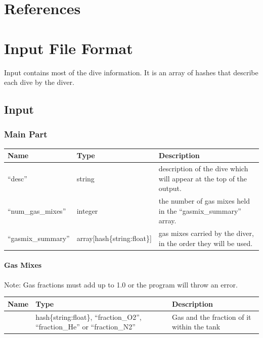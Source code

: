 \documentclass[12pt]{article}
\begin{document}
\newpage
\section{References}
\nocite{VPMforDummies}


\newpage

\appendix

\section{Input File Format}
Input contains most of the dive information. It is an array of hashes that describe each dive by the diver.

\subsection{Input}
\subsubsection{Main Part}
\begin{longtable}{|l|l|p{5cm}|}
\hline
 Name                 &  Type                         &  Description                                                          \\
\hline
 ``desc''             &  string                       &  description of the dive which will appear at the top of the output.  \\
\hline
 ``num\_gas\_mixes''  &  integer                      &  the number of gas mixes held in the ``gasmix\_summary'' array.       \\
\hline
 ``gasmix\_summary''  &  array[hash\{string:float\}]  &  gas mixes carried by the diver, in the order they will be used.      \\
\hline
\end{longtable}

\paragraph{Gas Mixes}
Note: Gas fractions must add up to 1.0 or the program will throw an error.
\begin{longtable}{|l|p{5cm}|p{5cm}|}
\hline
 Name                  &  Type                                                                                                &  Description  \\
\hline
   & hash\{string:float\}, ``fraction\_O2'', ``fraction\_He'' or ``fraction\_N2'' & Gas and the fraction of it within the tank  \\
\hline
\end{longtable}
\end{document}
